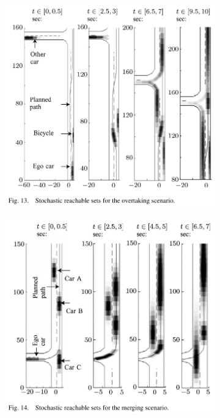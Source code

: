 \begin{figure}[!ht]
\begin{subfigure}{0.4\textwidth}
        \includegraphics[width=\textwidth]{img/33}\label{fig:33}
    \end{subfigure}
    \begin{subfigure}{0.4\textwidth}
        \includegraphics[width=\textwidth]{img/34}\label{fig:34}
    \end{subfigure}

\end{figure}
\clearpage

